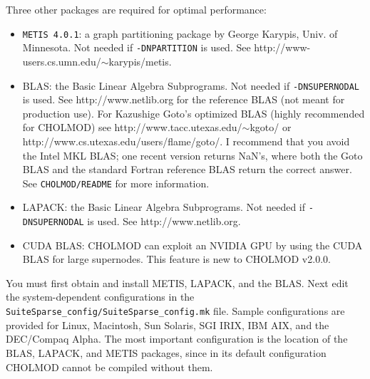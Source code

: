 \documentclass[11pt]{article}
\begin{document}
Three other packages are required for optimal performance:
\begin{itemize}
\item {\tt METIS 4.0.1}: a graph partitioning package by George Karypis,
    Univ. of Minnesota.  Not needed if {\tt -DNPARTITION} is used.
    See http://www-users.cs.umn.edu/$\sim$karypis/metis.
\item BLAS: the Basic Linear Algebra Subprograms.
    Not needed if {\tt -DNSUPERNODAL} is used.
    See http://www.netlib.org for the reference BLAS (not meant for production
    use).  For Kazushige Goto's optimized BLAS (highly recommended for CHOLMOD)
    see \newline
    http://www.tacc.utexas.edu/$\sim$kgoto/ or
    http://www.cs.utexas.edu/users/flame/goto/.
    I recommend that you avoid the Intel MKL BLAS; one recent
    version returns NaN's, where both the Goto BLAS and the standard
    Fortran reference BLAS return the correct answer.
    See {\tt CHOLMOD/README} for more information.
\item LAPACK: the Basic Linear Algebra Subprograms.
    Not needed if {\tt -DNSUPERNODAL} is used.
    See http://www.netlib.org.
\item CUDA BLAS:  CHOLMOD can exploit an NVIDIA GPU by using the CUDA BLAS
    for large supernodes.  This feature is new to CHOLMOD v2.0.0.
\end{itemize}

You must first obtain and install METIS, LAPACK, and the BLAS.
Next edit the system-dependent configurations in the
{\tt SuiteSparse\_config/SuiteSparse\_config.mk} file.
Sample configurations are provided
for Linux, Macintosh, Sun Solaris, SGI IRIX, IBM AIX, and the DEC/Compaq Alpha.
The most important configuration is the location of the BLAS, LAPACK, and METIS
packages, since in its default configuration CHOLMOD cannot be compiled without them.
\end{document}
